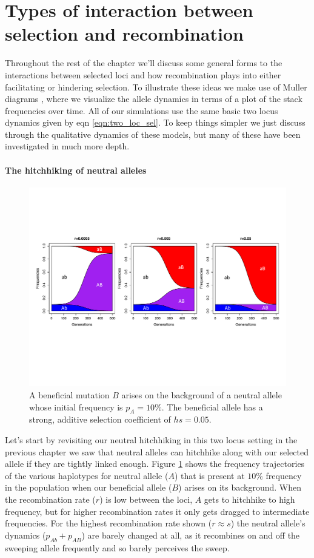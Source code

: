 \section{Types of interaction between selection and recombination}
Throughout the rest of the chapter we'll discuss some general forms to the interactions between selected loci and how recombination plays into either facilitating or hindering selection. 
To illustrate these ideas we make use of Muller diagrams \citep{muller1932some}, where we visualize the allele dynamics in terms of a plot of the stack frequencies over time. All of our simulations use the same basic two locus dynamics given by eqn \eqref{eqn:two_loc_sel}. To keep things simpler we just discuss through the qualitative dynamics of these models, but many of these have been investigated in much more depth.

\paragraph{The hitchhiking of neutral alleles}
\begin{figure}
\begin{center}
  \includegraphics[width = 0.9 \textwidth]{figures/selection_recom_interaction/Neutral_Hitchhiking_labeled.pdf}
\end{center}
\caption{A beneficial mutation $B$ arises on the background of a neutral allele whose initial frequency is $p_A=10\%$. The beneficial allele has a strong, additive selection coefficient of $hs=0.05$.} \label{fig:Neutral_HH}  %
\end{figure}
Let's start by revisiting our neutral hitchhiking in this two locus setting in the previous chapter we saw that neutral alleles can hitchhike along with our selected allele if they are tightly linked enough. Figure \ref{fig:Neutral_HH}  shows the frequency trajectories of the various haplotypes for neutral allele ($A$) that is present at $10\%$ frequency in the population when our beneficial allele ($B$) arises on its background. When the recombination rate ($r$) is low between the loci, $A$ gets to hitchhike to high frequency, but for higher recombination rates it only gets dragged to intermediate frequencies. For the highest recombination rate shown ($r \approx s$) the neutral allele's dynamics ($p_{Ab}+p_{AB}$) are barely changed at all, as it recombines on and off the sweeping allele frequently and so barely perceives the sweep. 

